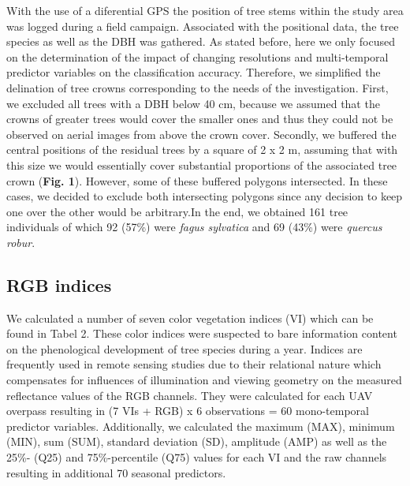 \documentclass[]{article}
\begin{document}
With the use of a diferential GPS the position of tree stems within the
study area was logged during a field campaign. Associated with the
positional data, the tree species as well as the DBH was gathered. As
stated before, here we only focused on the determination of the impact
of changing resolutions and multi-temporal predictor variables on the
classification accuracy. Therefore, we simplified the delination of tree
crowns corresponding to the needs of the investigation. First, we
excluded all trees with a DBH below 40 cm, because we assumed that the
crowns of greater trees would cover the smaller ones and thus they could
not be observed on aerial images from above the crown cover. Secondly,
we buffered the central positions of the residual trees by a square of 2
x 2 m, assuming that with this size we would essentially cover
substantial proportions of the associated tree crown (\textbf{Fig. 1}).
However, some of these buffered polygons intersected. In these cases, we
decided to exclude both intersecting polygons since any decision to keep
one over the other would be arbitrary.In the end, we obtained 161 tree
individuals of which 92 (57\%) were \emph{fagus sylvatica} and 69 (43\%)
were \emph{quercus robur}.

\hypertarget{rgb-indices}{%
\subsection{RGB indices}\label{rgb-indices}}

We calculated a number of seven color vegetation indices (VI) which can
be found in Tabel 2. These color indices were suspected to bare
information content on the phenological development of tree species
during a year. Indices are frequently used in remote sensing studies due
to their relational nature which compensates for influences of
illumination and viewing geometry on the measured reflectance values of
the RGB channels. They were calculated for each UAV overpass resulting
in (7 VIs + RGB) x 6 observations = 60 mono-temporal predictor
variables. Additionally, we calculated the maximum (MAX), minimum (MIN),
sum (SUM), standard deviation (SD), amplitude (AMP) as well as the 25\%-
(Q25) and 75\%-percentile (Q75) values for each VI and the raw channels
resulting in additional 70 seasonal predictors.
\end{document}
